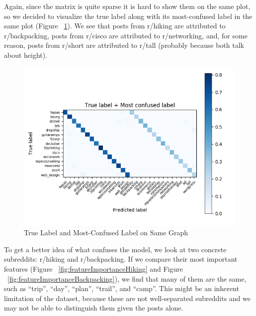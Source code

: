 \documentclass{sig-alternate-05-2015}
\begin{document}
Again, since the matrix is quite sparse it is hard to show them on the same plot, so we decided to visualize the true label along with its most-confused label in the same plot (Figure ~\ref{fig:confusionMatrix3}). We see that posts from r/hiking are attributed to r/backpacking, posts from r/cisco are attributed to r/networking, and, for some reason, posts from r/short are attributed to r/tall (probably because both talk about height).

\begin{figure}[H]
\centering
\includegraphics[width=\linewidth]{plots/confusion-matrix-true-label-vs-most-confused-label.png}
\caption{True Label and Most-Confused Label on Same Graph}
\label{fig:confusionMatrix3}
\end{figure}

To get a better idea of what confuses the model, we look at two concrete subreddits: r/hiking and r/backpacking. If we compare their most important features (Figure ~\ref{fig:featureImportanceHiking} and Figure ~\ref{fig:featureImportanceBackpacking}), we find that many of them are the same, such as ``trip'', ``day'', ``plan'', ``trail'', and ``camp''. This might be an inherent limitation of the dataset, because these are not well-separated subreddits and we may not be able to distinguish them given the posts alone.
\end{document}
